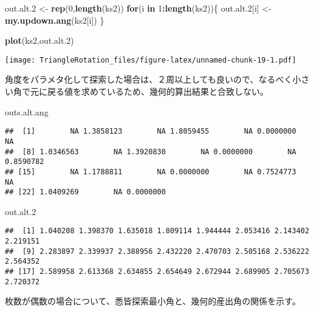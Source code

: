 \documentclass[]{article}
\newenvironment{Shaded}{\begin{snugshade}}{\end{snugshade}}
\newcommand{\KeywordTok}[1]{\textcolor[rgb]{0.13,0.29,0.53}{\textbf{#1}}}
\newcommand{\DecValTok}[1]{\textcolor[rgb]{0.00,0.00,0.81}{#1}}
\newcommand{\StringTok}[1]{\textcolor[rgb]{0.31,0.60,0.02}{#1}}
\newcommand{\ControlFlowTok}[1]{\textcolor[rgb]{0.13,0.29,0.53}{\textbf{#1}}}
\newcommand{\OperatorTok}[1]{\textcolor[rgb]{0.81,0.36,0.00}{\textbf{#1}}}
\newcommand{\NormalTok}[1]{#1}
\begin{document}
\begin{Shaded}
\begin{Highlighting}[]
\NormalTok{out.alt.}\DecValTok{2}\NormalTok{ <-}\StringTok{ }\KeywordTok{rep}\NormalTok{(}\DecValTok{0}\NormalTok{,}\KeywordTok{length}\NormalTok{(ks2))}
\ControlFlowTok{for}\NormalTok{(i }\ControlFlowTok{in} \DecValTok{1}\OperatorTok{:}\KeywordTok{length}\NormalTok{(ks2))\{}
\NormalTok{  out.alt.}\DecValTok{2}\NormalTok{[i] <-}\StringTok{ }\KeywordTok{my.updown.ang}\NormalTok{(ks2[i])}
\NormalTok{\}}

\KeywordTok{plot}\NormalTok{(ks2,out.alt.}\DecValTok{2}\NormalTok{)}
\end{Highlighting}
\end{Shaded}

\texttt{[image: TriangleRotation\_files/figure-latex/unnamed-chunk-19-1.pdf]}

角度をパラメタ化して探索した場合は、２周以上しても良いので、なるべく小さい角で元に戻る値を求めているため、幾何的算出結果と合致しない。

\begin{Shaded}
\begin{Highlighting}[]
\NormalTok{outs.alt.ang}
\end{Highlighting}
\end{Shaded}

\begin{verbatim}
##  [1]        NA 1.3858123        NA 1.8059455        NA 0.0000000        NA
##  [8] 1.0346563        NA 1.3920830        NA 0.0000000        NA 0.8590782
## [15]        NA 1.1788811        NA 0.0000000        NA 0.7524773        NA
## [22] 1.0409269        NA 0.0000000
\end{verbatim}

\begin{Shaded}
\begin{Highlighting}[]
\NormalTok{out.alt.}\DecValTok{2}
\end{Highlighting}
\end{Shaded}

\begin{verbatim}
##  [1] 1.040208 1.398370 1.635018 1.809114 1.944444 2.053416 2.143402 2.219151
##  [9] 2.283897 2.339937 2.388956 2.432220 2.470703 2.505168 2.536222 2.564352
## [17] 2.589958 2.613368 2.634855 2.654649 2.672944 2.689905 2.705673 2.720372
\end{verbatim}

枚数が偶数の場合について、悉皆探索最小角と、幾何的産出角の関係を示す。
\end{document}
